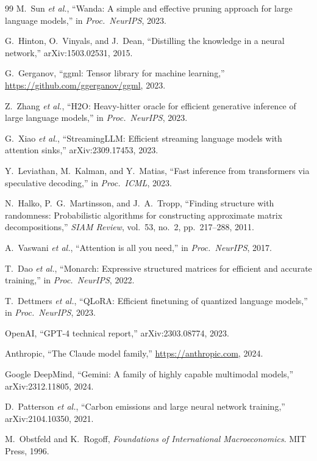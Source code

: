 \documentclass[11pt,a4paper,openright]{book}
\begin{document}
\begin{thebibliography}{99}
	M.~Sun \emph{et al.}, ``Wanda: A simple and effective pruning approach for
	large language models,''
	in \emph{Proc.\ NeurIPS}, 2023.

	G.~Hinton, O.~Vinyals, and J.~Dean, ``Distilling the knowledge in a neural
	network,''
	arXiv:1503.02531, 2015.

	G.~Gerganov, ``ggml: Tensor library for machine learning,''
	\url{https://github.com/ggerganov/ggml}, 2023.

	Z.~Zhang \emph{et al.}, ``H2O: Heavy-hitter oracle for efficient generative
	inference of large language models,''
	in \emph{Proc.\ NeurIPS}, 2023.

	G.~Xiao \emph{et al.}, ``StreamingLLM: Efficient streaming language models
	with attention sinks,''
	arXiv:2309.17453, 2023.

	Y.~Leviathan, M.~Kalman, and Y.~Matias, ``Fast inference from transformers
	via speculative decoding,''
	in \emph{Proc.\ ICML}, 2023.

	N.~Halko, P.~G.~Martinsson, and J.~A.~Tropp, ``Finding structure with
	randomness: Probabilistic algorithms for constructing approximate matrix
	decompositions,''
	\emph{SIAM Review}, vol.~53, no.~2, pp.~217--288, 2011.

	A.~Vaswani \emph{et al.}, ``Attention is all you need,''
	in \emph{Proc.\ NeurIPS}, 2017.

	T.~Dao \emph{et al.}, ``Monarch: Expressive structured matrices for
	efficient and accurate training,''
	in \emph{Proc.\ NeurIPS}, 2022.

	T.~Dettmers \emph{et al.}, ``QLoRA: Efficient finetuning of quantized
	language models,''
	in \emph{Proc.\ NeurIPS}, 2023.

	OpenAI, ``GPT-4 technical report,''
	arXiv:2303.08774, 2023.

	Anthropic, ``The Claude model family,''
	\url{https://anthropic.com}, 2024.

	Google DeepMind, ``Gemini: A family of highly capable multimodal models,''
	arXiv:2312.11805, 2024.

	D.~Patterson \emph{et al.}, ``Carbon emissions and large neural network
	training,''
	arXiv:2104.10350, 2021.

	M.~Obstfeld and K.~Rogoff, \emph{Foundations of International
		Macroeconomics}. MIT Press, 1996.

\end{thebibliography}
\end{document}
